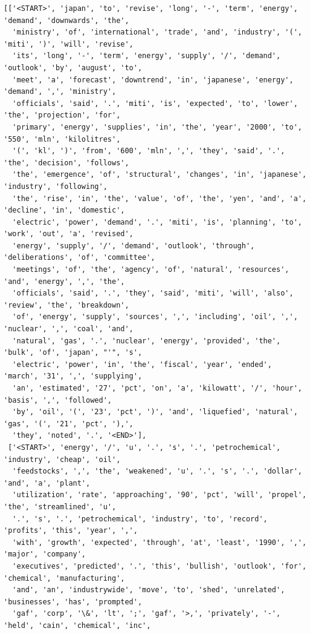 \documentclass[11pt]{article}
\begin{document}
    \begin{Verbatim}[commandchars=\\\{\}]
[['<START>', 'japan', 'to', 'revise', 'long', '-', 'term', 'energy', 'demand', 'downwards', 'the',
  'ministry', 'of', 'international', 'trade', 'and', 'industry', '(', 'miti', ')', 'will', 'revise',
  'its', 'long', '-', 'term', 'energy', 'supply', '/', 'demand', 'outlook', 'by', 'august', 'to',
  'meet', 'a', 'forecast', 'downtrend', 'in', 'japanese', 'energy', 'demand', ',', 'ministry',
  'officials', 'said', '.', 'miti', 'is', 'expected', 'to', 'lower', 'the', 'projection', 'for',
  'primary', 'energy', 'supplies', 'in', 'the', 'year', '2000', 'to', '550', 'mln', 'kilolitres',
  '(', 'kl', ')', 'from', '600', 'mln', ',', 'they', 'said', '.', 'the', 'decision', 'follows',
  'the', 'emergence', 'of', 'structural', 'changes', 'in', 'japanese', 'industry', 'following',
  'the', 'rise', 'in', 'the', 'value', 'of', 'the', 'yen', 'and', 'a', 'decline', 'in', 'domestic',
  'electric', 'power', 'demand', '.', 'miti', 'is', 'planning', 'to', 'work', 'out', 'a', 'revised',
  'energy', 'supply', '/', 'demand', 'outlook', 'through', 'deliberations', 'of', 'committee',
  'meetings', 'of', 'the', 'agency', 'of', 'natural', 'resources', 'and', 'energy', ',', 'the',
  'officials', 'said', '.', 'they', 'said', 'miti', 'will', 'also', 'review', 'the', 'breakdown',
  'of', 'energy', 'supply', 'sources', ',', 'including', 'oil', ',', 'nuclear', ',', 'coal', 'and',
  'natural', 'gas', '.', 'nuclear', 'energy', 'provided', 'the', 'bulk', 'of', 'japan', "'", 's',
  'electric', 'power', 'in', 'the', 'fiscal', 'year', 'ended', 'march', '31', ',', 'supplying',
  'an', 'estimated', '27', 'pct', 'on', 'a', 'kilowatt', '/', 'hour', 'basis', ',', 'followed',
  'by', 'oil', '(', '23', 'pct', ')', 'and', 'liquefied', 'natural', 'gas', '(', '21', 'pct', '),',
  'they', 'noted', '.', '<END>'],
 ['<START>', 'energy', '/', 'u', '.', 's', '.', 'petrochemical', 'industry', 'cheap', 'oil',
  'feedstocks', ',', 'the', 'weakened', 'u', '.', 's', '.', 'dollar', 'and', 'a', 'plant',
  'utilization', 'rate', 'approaching', '90', 'pct', 'will', 'propel', 'the', 'streamlined', 'u',
  '.', 's', '.', 'petrochemical', 'industry', 'to', 'record', 'profits', 'this', 'year', ',',
  'with', 'growth', 'expected', 'through', 'at', 'least', '1990', ',', 'major', 'company',
  'executives', 'predicted', '.', 'this', 'bullish', 'outlook', 'for', 'chemical', 'manufacturing',
  'and', 'an', 'industrywide', 'move', 'to', 'shed', 'unrelated', 'businesses', 'has', 'prompted',
  'gaf', 'corp', '\&', 'lt', ';', 'gaf', '>,', 'privately', '-', 'held', 'cain', 'chemical', 'inc',

\end{Verbatim}
\end{document}

